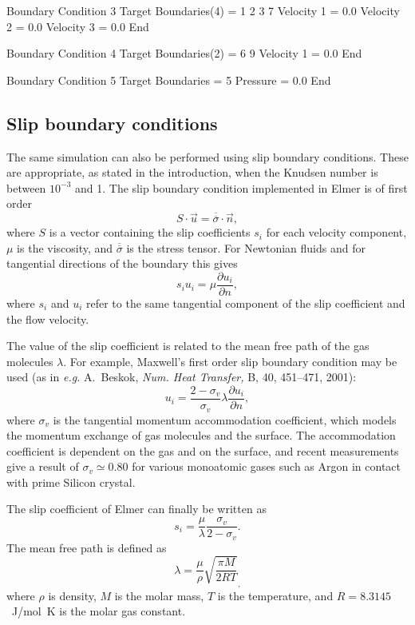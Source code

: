 Boundary Condition 3
  Target Boundaries(4) = 1 2 3 7
   Velocity 1 = 0.0
   Velocity 2 = 0.0
   Velocity 3 = 0.0
End

Boundary Condition 4
  Target Boundaries(2) = 6 9
   Velocity 1 = 0.0
End

Boundary Condition 5
  Target Boundaries = 5
  Pressure = 0.0
End
\ttend

\subsection*{Slip boundary conditions}

The same simulation can also be performed using slip boundary
conditions. These are appropriate, as stated in the introduction, when the
Knudsen number is between $10^{-3}$ and 1. The slip boundary condition
implemented in Elmer is of first order 
\begin{equation}
S\cdot \vec{u} = \overline{\overline{\sigma}}\cdot\vec{n},
\end{equation}
where $S$ is a vector containing the slip coefficients $s_i$ for each
velocity component, $\mu$ is the viscosity, and
$\overline{\overline{\sigma}}$ is the stress tensor. For Newtonian
fluids and for tangential directions of the boundary this gives
\begin{equation}
s_i u_i = \mu\frac{\partial u_i}{\partial n},
\end{equation}
where $s_i$ and $u_i$ refer to the same tangential component of the
slip coefficient and the flow velocity.

The value of the slip coefficient is related to the mean free path of
the gas molecules $\lambda$. For example, Maxwell's first order slip
boundary condition may be used (as in {\em e.g.} A.~Beskok, {\em
Num. Heat Transfer,} B, 40, 451--471, 2001):
\begin{equation}
u_i = \frac{2-\sigma_v}{\sigma_v}\lambda 
\frac{\partial u_i}{\partial n},
\end{equation}
where $\sigma_v$ is the tangential momentum accommodation coefficient,
which models the momentum exchange of gas molecules and the
surface. The accommodation coefficient is dependent on the gas and on
the surface, and recent measurements give a result of $\sigma_v\simeq
0.80$ for various monoatomic gases such as Argon in contact with
prime Silicon crystal. 

The slip coefficient of Elmer can finally be written as
\begin{equation}
s_i = \frac{\mu}{\lambda}\frac{\sigma_v}{2-\sigma_v}.
\end{equation}
The mean free path is defined as
\begin{equation}
\lambda = \frac{\mu}{\rho}\sqrt{\frac{\pi M}{2RT}}_,
\end{equation}
where $\rho$ is density, $M$ is the molar mass, $T$ is the
temperature, and $R=8.3145$~J/mol~K is the molar gas constant.

